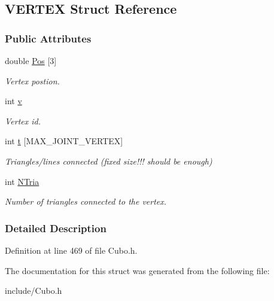\hypertarget{structVERTEX}{}\subsection{V\+E\+R\+T\+EX Struct Reference}
\label{structVERTEX}
\subsubsection*{Public Attributes}
\begin{DoxyCompactItemize}
\item 
double \hyperlink{structVERTEX_a863738e46f14b3bfc674ad87d35f143d}{Pos} \mbox{[}3\mbox{]}\hypertarget{structVERTEX_a863738e46f14b3bfc674ad87d35f143d}{}\label{structVERTEX_a863738e46f14b3bfc674ad87d35f143d}

\begin{DoxyCompactList}\small\item\em Vertex postion. \end{DoxyCompactList}\item 
int \hyperlink{structVERTEX_ac8859e8c1ce357c4c8b37bbb1936ba1c}{v}\hypertarget{structVERTEX_ac8859e8c1ce357c4c8b37bbb1936ba1c}{}\label{structVERTEX_ac8859e8c1ce357c4c8b37bbb1936ba1c}

\begin{DoxyCompactList}\small\item\em Vertex id. \end{DoxyCompactList}\item 
int \hyperlink{structVERTEX_ad82192d51ed2fc5973d034b41d0e4f27}{t} \mbox{[}M\+A\+X\+\_\+\+J\+O\+I\+N\+T\+\_\+\+V\+E\+R\+T\+EX\mbox{]}\hypertarget{structVERTEX_ad82192d51ed2fc5973d034b41d0e4f27}{}\label{structVERTEX_ad82192d51ed2fc5973d034b41d0e4f27}

\begin{DoxyCompactList}\small\item\em Triangles/lines connected (fixed size!!! should be enough) \end{DoxyCompactList}\item 
int \hyperlink{structVERTEX_a12a47df39f8f45d8c6da40a2238b1033}{N\+Tria}\hypertarget{structVERTEX_a12a47df39f8f45d8c6da40a2238b1033}{}\label{structVERTEX_a12a47df39f8f45d8c6da40a2238b1033}

\begin{DoxyCompactList}\small\item\em Number of triangles connected to the vertex. \end{DoxyCompactList}\end{DoxyCompactItemize}


\subsubsection{Detailed Description}


Definition at line 469 of file Cubo.\+h.



The documentation for this struct was generated from the following file\+:\begin{DoxyCompactItemize}
\item 
include/Cubo.\+h\end{DoxyCompactItemize}
